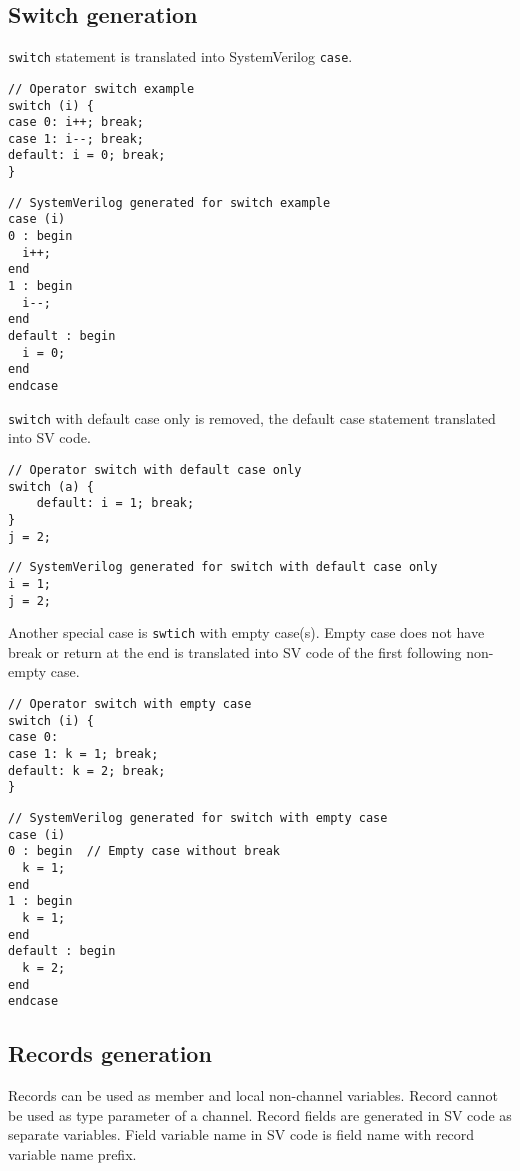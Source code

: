 \subsection{Switch generation}\label{section:switch_gen}

{\tt switch} statement is translated into SystemVerilog {\tt case}.

\begin{lstlisting}[style=mycpp]
// Operator switch example
switch (i) {
case 0: i++; break;
case 1: i--; break;
default: i = 0; break;
}
\end{lstlisting}
%
\begin{lstlisting}[style=myverilog]
// SystemVerilog generated for switch example
case (i)
0 : begin  
  i++;
end
1 : begin
  i--;
end
default : begin
  i = 0;
end
endcase
\end{lstlisting}

{\tt switch} with default case only is removed, the default case statement translated into SV code.
%
\begin{lstlisting}[style=mycpp]
// Operator switch with default case only
switch (a) {
    default: i = 1; break;
}
j = 2;
\end{lstlisting}
%
\begin{lstlisting}[style=myverilog]
// SystemVerilog generated for switch with default case only
i = 1;
j = 2;
\end{lstlisting}

Another special case is {\tt swtich} with empty case(s). Empty case does not have break or return at the end is translated into SV code of the first following non-empty case. 
%
\begin{lstlisting}[style=mycpp]
// Operator switch with empty case
switch (i) {
case 0: 
case 1: k = 1; break;
default: k = 2; break;
}
\end{lstlisting}
%
\begin{lstlisting}[style=myverilog]
// SystemVerilog generated for switch with empty case
case (i)
0 : begin  // Empty case without break
  k = 1;
end
1 : begin
  k = 1;
end
default : begin
  k = 2;
end
endcase
\end{lstlisting}


\subsection{Records generation}\label{section:record_gen}

Records can be used as member and local non-channel variables. Record cannot be used as type parameter of a channel. Record fields are generated in SV code as separate variables. Field variable name in SV code is field name with record variable name prefix.

